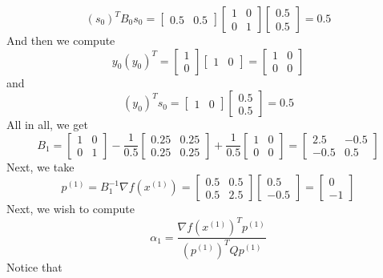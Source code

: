 \documentclass[12pt]{article}
\begin{document}
\[
(s_0)^T B_0 s_0 =
\begin{bmatrix}
0.5 & 0.5 
\end{bmatrix}
\begin{bmatrix}
1 & 0\\
0 & 1 
\end{bmatrix}
\begin{bmatrix}
0.5\\
0.5 
\end{bmatrix} = 0.5
\] And then we compute
\[
y_0(y_0)^T = \begin{bmatrix}
1\\
0
\end{bmatrix} 
\begin{bmatrix}
1 & 0
\end{bmatrix} 
=
\begin{bmatrix}
1 & 0\\
0 & 0
\end{bmatrix}
\]
and 
\[
(y_0)^T s_0 = \begin{bmatrix}
1 & 0
\end{bmatrix} \begin{bmatrix}
0.5 \\ 0.5
\end{bmatrix} = 0.5
\] All in all, we get
\[
B_1 = \begin{bmatrix}
1 & 0\\
0 & 1
\end{bmatrix} - \frac{1}{0.5} 
\begin{bmatrix}
0.25 & 0.25\\
0.25 & 0.25
\end{bmatrix} +
\frac{1}{0.5} \begin{bmatrix}
1 & 0\\
0 & 0
\end{bmatrix} = 
\begin{bmatrix}
2.5 & -0.5\\
-0.5 & 0.5
\end{bmatrix}
\] Next, we take
\[
p^{(1)} = B_1^{-1} \nabla f(x^{(1)}) = 
\begin{bmatrix}
0.5 & 0.5\\
0.5 & 2.5
\end{bmatrix}
\begin{bmatrix}
0.5 \\
-0.5
\end{bmatrix} =
\begin{bmatrix}
0\\
-1
\end{bmatrix}
\] Next, we wish to compute
\[
\alpha_1 = \frac{\nabla f(x^{(1)})^T p^{(1)}  }{(p^{(1)} )^T Q p^{(1)} }
\] Notice that
\end{document}
